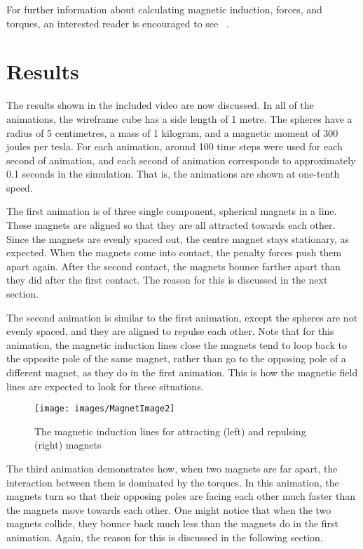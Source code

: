 \documentclass[tog]{acmsiggraph}
\begin{document}
For further information about calculating magnetic induction, forces, and torques, an interested reader is encouraged to see ~\cite{Thomaszewski:2008:MIM}.

\section{Results}

The results shown in the included video are now discussed. In all of the animations, the wireframe cube has a side length of 1 metre. The spheres have a radius of 5 centimetres, a mass of 1 kilogram, and a magnetic moment of 300 joules per tesla. For each animation, around 100 time steps were used for each second of animation, and each second of animation corresponds to approximately 0.1 seconds in the simulation. That is, the animations are shown at one-tenth speed.

The first animation is of three single component, spherical magnets in a line. These magnets are aligned so that they are all attracted towards each other. Since the magnets are evenly spaced out, the centre magnet stays stationary, as expected. When the magnets come into contact, the penalty forces push them apart again. After the second contact, the magnets bounce farther apart than they did after the first contact. The reason for this is discussed in the next section.

The second animation is similar to the first animation, except the spheres are not evenly spaced, and they are aligned to repulse each other. Note that for this animation, the magnetic induction lines close the magnets tend to loop back to the opposite pole of the same magnet, rather than go to the opposing pole of a different magnet, as they do in the first animation. This is how the magnetic field lines are expected to look for these situations.

\begin{figure}[ht]
  \centering
  \texttt{[image: images/MagnetImage2]}
  \caption{The magnetic induction lines for attracting (left) and repulsing (right) magnets}
\end{figure}

The third animation demonstrates how, when two magnets are far apart, the interaction between them is dominated by the torques. In this animation, the magnets turn so that their opposing poles are facing each other much faster than the magnets move towards each other. One might notice that when the two magnets collide, they bounce back much less than the magnets do in the first animation. Again, the reason for this is discussed in the following section.
\end{document}
